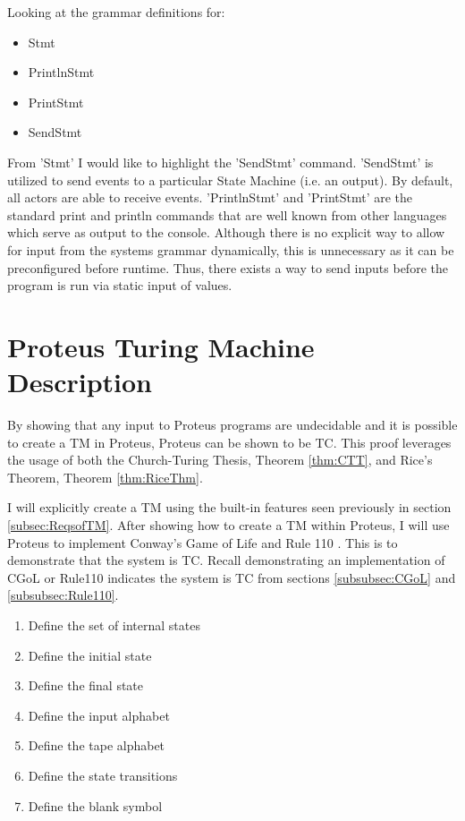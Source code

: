 Looking at the grammar definitions for:
\begin{itemize}
    \item Stmt
    \item PrintlnStmt
    \item PrintStmt
    \item SendStmt
\end{itemize}

From 'Stmt' I would like to highlight the 'SendStmt' command.
'SendStmt' is utilized to send events to a particular State Machine (i.e. an output).
By default, all actors are able to receive events.
'PrintlnStmt' and 'PrintStmt' are the standard print and println commands that are well known from other languages which serve as output to the console.
Although there is no explicit way to allow for input from the systems grammar dynamically, this is unnecessary as it can be preconfigured before runtime.
Thus, there exists a way to send inputs before the program is run via static input of values.

\section{Proteus Turing Machine Description}\label{sec:ProteusTMDescr}

By showing that any input to Proteus programs are undecidable and it is possible to create a TM in Proteus, Proteus can be shown to be TC.
This proof leverages the usage of both the Church-Turing Thesis, Theorem \ref{thm:CTT}, and Rice's Theorem, Theorem \ref{thm:RiceThm}.

I will explicitly create a TM using the built-in features seen previously in section \ref{subsec:ReqsofTM}.
After showing how to create a TM within Proteus, I will use Proteus to implement Conway's Game of Life and Rule 110 .
This is to demonstrate that the system is TC.
Recall demonstrating an implementation of CGoL or Rule110 indicates the system is TC from sections \ref{subsubsec:CGoL} and \ref{subsubsec:Rule110}.

\begin{enumerate}
    \item Define the set of internal states
    \item Define the initial state
    \item Define the final state
    \item Define the input alphabet
    \item Define the tape alphabet
    \item Define the state transitions
    \item Define the blank symbol
\end{enumerate}

